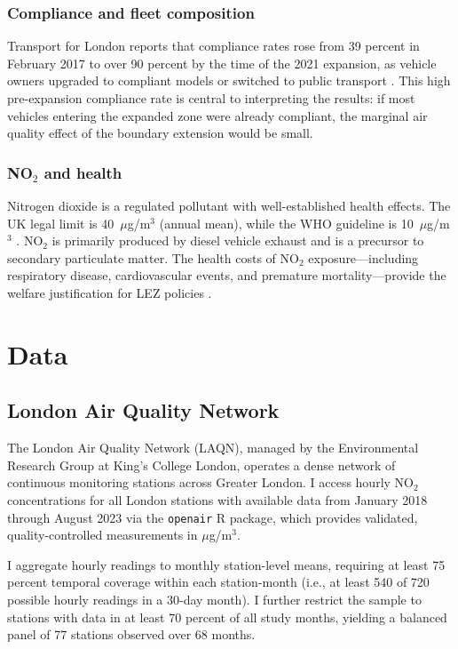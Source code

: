 \documentclass[12pt]{article}
\begin{document}
\subsubsection*{Compliance and fleet composition} Transport for London reports that compliance rates rose from 39 percent in February 2017 to over 90 percent by the time of the 2021 expansion, as vehicle owners upgraded to compliant models or switched to public transport \citep{tfl2023}. This high pre-expansion compliance rate is central to interpreting the results: if most vehicles entering the expanded zone were already compliant, the marginal air quality effect of the boundary extension would be small.

\subsubsection*{NO$_2$ and health} Nitrogen dioxide is a regulated pollutant with well-established health effects. The UK legal limit is 40~$\mu$g/m$^3$ (annual mean), while the WHO guideline is 10~$\mu$g/m$^3$ \citep{who2021}. NO$_2$ is primarily produced by diesel vehicle exhaust and is a precursor to secondary particulate matter. The health costs of NO$_2$ exposure---including respiratory disease, cardiovascular events, and premature mortality---provide the welfare justification for LEZ policies \citep{deryugina2019, isen2017}.


\section{Data}

\subsection{London Air Quality Network}

The London Air Quality Network (LAQN), managed by the Environmental Research Group at King's College London, operates a dense network of continuous monitoring stations across Greater London. I access hourly NO$_2$ concentrations for all London stations with available data from January 2018 through August 2023 via the \texttt{openair} R package, which provides validated, quality-controlled measurements in $\mu$g/m$^3$.

I aggregate hourly readings to monthly station-level means, requiring at least 75 percent temporal coverage within each station-month (i.e., at least 540 of 720 possible hourly readings in a 30-day month). I further restrict the sample to stations with data in at least 70 percent of all study months, yielding a balanced panel of 77 stations observed over 68 months.
\end{document}
